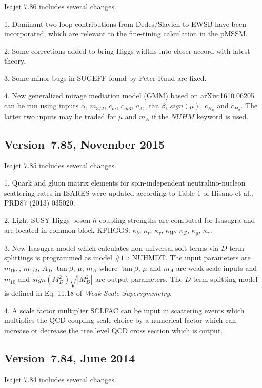 Isajet 7.86 includes several changes.

1. Dominant two loop contributions from Dedes/Slavich to EWSB have been
incorporated, which are relevant to the fine-tining calculation in the pMSSM.

2. Some corrections added to bring Higgs widths into closer accord with
latest theory.

3. Some minor bugs in SUGEFF found by Peter Ruud are fixed.

4. New generalized mirage mediation model (GMM) based on arXiv:1610.06205
can be run using inputs $\alpha$, $m_{3/2}$, $c_m$, $c_{m3}$, $a_3$, $\tan\beta$,
$sign (\mu )$, $c_{H_u}$ and $c_{H_d}$. The latter two inputs may be traded
for $\mu$ and $m_A$ if the $NUHM$ keyword is used.

\subsection{Version~7.85, November 2015}

Isajet 7.85 includes several changes.

1. Quark and gluon matrix elements for spin-independent neutralino-nucleon
scattering rates in ISARES were updated according to 
Table 1 of Hisano et al., PRD87 (2013) 035020. 

2. Light SUSY Higgs boson $h$ coupling strengths are computed for Isasugra
and are located in common block KPHGGS: $\kappa_b$, 
$\kappa_t$, $\kappa_\tau$, $\kappa_W$, $\kappa_Z$, $\kappa_g$, $\kappa_\gamma$.

3. New Isasugra model which calculates non-universal 
soft terms via $D$-term splittings is programmed as model $\#11$: NUHMDT.
The input parameters are $m_{16},$, $m_{1/2}$, $A_0$, $\tan\beta$, $\mu$, 
$m_A$ where $\tan\beta$, $\mu$ and $m_A$ are weak scale inputs
and $m_{10}$ and $sign(M_D^2)\sqrt{|M_D^2|}$ are output parameters. 
The $D$-term splitting model is defined in Eq. 11.18 of 
{\it Weak Scale Supersymmetry}.

4. A scale factor multiplier SCLFAC can be input in scattering events
which multiplies the QCD coupling scale choice by a numerical factor
which can increase or decrease the tree level QCD cross section which is output.

\subsection{Version~7.84, June 2014}

Isajet 7.84 includes several changes.


